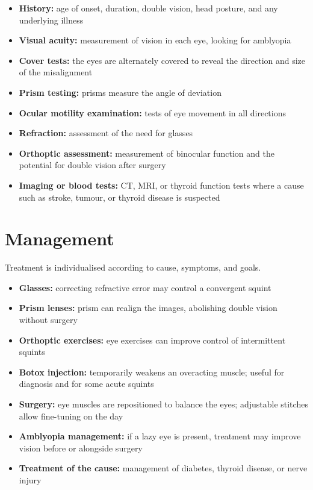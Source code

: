 \begin{itemize}
    \item \textbf{History:} age of onset, duration, double vision, head posture, and any underlying illness
    \item \textbf{Visual acuity:} measurement of vision in each eye, looking for amblyopia
    \item \textbf{Cover tests:} the eyes are alternately covered to reveal the direction and size of the misalignment
    \item \textbf{Prism testing:} prisms measure the angle of deviation
    \item \textbf{Ocular motility examination:} tests of eye movement in all directions
    \item \textbf{Refraction:} assessment of the need for glasses
    \item \textbf{Orthoptic assessment:} measurement of binocular function and the potential for double vision after surgery
    \item \textbf{Imaging or blood tests:} CT, MRI, or thyroid function tests where a cause such as stroke, tumour, or thyroid disease is suspected
\end{itemize}

\section*{Management}
Treatment is individualised according to cause, symptoms, and goals.

\begin{itemize}
    \item \textbf{Glasses:} correcting refractive error may control a convergent squint
    \item \textbf{Prism lenses:} prism can realign the images, abolishing double vision without surgery
    \item \textbf{Orthoptic exercises:} eye exercises can improve control of intermittent squints
    \item \textbf{Botox injection:} temporarily weakens an overacting muscle; useful for diagnosis and for some acute squints
    \item \textbf{Surgery:} eye muscles are repositioned to balance the eyes; adjustable stitches allow fine-tuning on the day
    \item \textbf{Amblyopia management:} if a lazy eye is present, treatment may improve vision before or alongside surgery
    \item \textbf{Treatment of the cause:} management of diabetes, thyroid disease, or nerve injury
\end{itemize}

